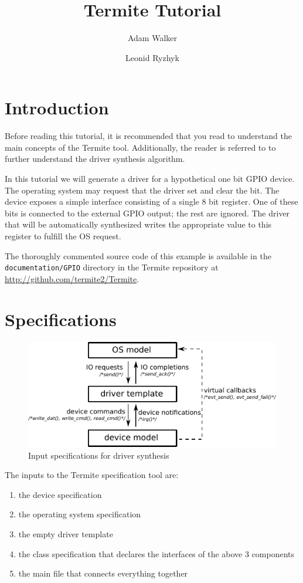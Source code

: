 \documentclass{article}
\newcommand{\code}[1]{\texttt{#1}}
\begin{document}
\title{Termite Tutorial}
\author{Adam Walker \and Leonid Ryzhyk}

\maketitle

\tableofcontents

\section{Introduction}

Before reading this tutorial, it is recommended that you read \cite{Ryzhyk_WKLRSV_14} to understand the main concepts of the Termite tool. Additionally, the reader is referred to \cite{Walker_Ryzhyk_14} to further understand the driver synthesis algorithm.

In this tutorial we will generate a driver for a hypothetical one bit GPIO device. The operating system may request that the driver set and clear the bit. The device exposes a simple interface consisting of a single 8 bit register. One of these bits is connected to the external GPIO output; the rest are ignored. The driver that will be automatically synthesized writes the appropriate value to this register to fulfill the OS request. 

The thoroughly commented source code of this example is available in the \code{documentation/GPIO} directory in the Termite repository at \url{http://github.com/termite2/Termite}.

\section{Specifications}

\begin{figure}[t]
    \center
    \includegraphics[width=0.75\linewidth]{figs/actions.pdf}
    \caption{Input specifications for driver synthesis}
    \label{fig:actions}
\end{figure}

The inputs to the Termite specification tool are:
\begin{enumerate}
    \item the device specification
    \item the operating system specification
    \item the empty driver template
    \item the class specification that declares the interfaces of the above 3 components
    \item the main file that connects everything together
\end{enumerate}
\end{document}
